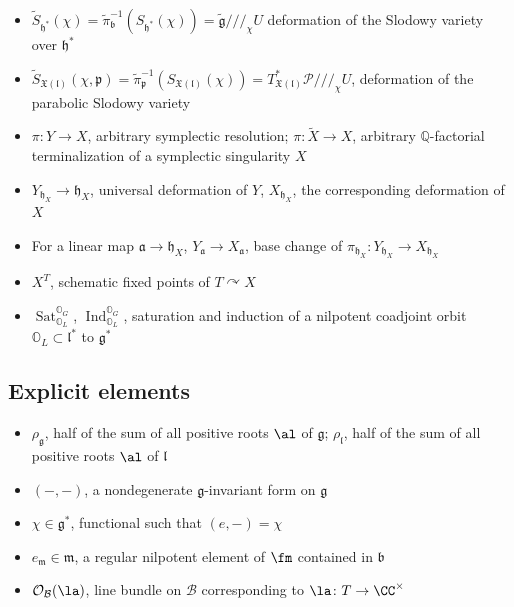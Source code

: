 \documentclass[12pt]{amsart}
\begin{document}
\begin{itemize}
    \item $\widetilde{S}_{\mathfrak{h}^*}(\chi)=\widetilde{\pi}^{-1}_{\mathfrak{b}}(S_{\mathfrak{h}^*}(\chi))=\widetilde{\mathfrak{g}}/\!/\!/_{\chi} U$  deformation of the Slodowy variety over $\mathfrak{h}^*$
    \item $\widetilde{S}_{\mathfrak{X}(\mathfrak{l})}(\chi,\mathfrak{p})=\widetilde{\pi}_{\mathfrak{p}}^{-1}(S_{\mathfrak{X}(\mathfrak{l})}(\chi))=T^*_{\mathfrak{X}(\mathfrak{l})}\mathcal{P}/\!/\!/_\chi U$, deformation of the parabolic Slodowy variety
    \item $\pi\colon Y \rightarrow X$, arbitrary symplectic resolution; $\pi\colon \widetilde{X} \rightarrow X$, arbitrary $\mathbb{Q}$-factorial terminalization of a symplectic singularity $X$
    \item $Y_{\mathfrak{h}_X} \rightarrow \mathfrak{h}_X$, universal deformation of $Y$, $X_{\mathfrak{h}_X}$, the corresponding deformation of $X$
    \item For a linear map $\mathfrak{a} \rightarrow \mathfrak{h}_X$, $Y_{\mathfrak{a}} \rightarrow X_{\mathfrak{a}}$, base change of $\pi_{\mathfrak{h}_X}\colon Y_{\mathfrak{h}_X} \rightarrow X_{\mathfrak{h}_X}$
        \item $X^T$, schematic fixed points of $T \curvearrowright X$
     \item $\operatorname{Sat}_{\mathbb{O}_L}^{\mathbb{O}_G}$, $\operatorname{Ind}_{\mathbb{O}_L}^{\mathbb{O}_G}$, saturation and induction of a nilpotent coadjoint orbit $\mathbb{O}_L \subset \mathfrak{l}^*$ to $\mathfrak{g}^*$    
\end{itemize}    


   
\subsection{Explicit elements}
\begin{itemize}
\item $\rho_{\mathfrak{g}}$, half of the sum of all positive roots $\al$ of $\mathfrak{g}$;  $\rho_{\mathfrak{l}}$, half of the sum of all positive roots $\al$ of $\mathfrak{l}$
\item $(-,-)$, a nondegenerate $\mathfrak{g}$-invariant form on $\mathfrak{g}$
\item $\chi \in \mathfrak{g}^*$, functional such that $(e,-)=\chi$
\item $e_{\mathfrak{m}} \in \mathfrak{m}$, a regular nilpotent element of $\fm$ contained in $\mathfrak{b}$
\item $\mathcal{O}_{\mathcal{B}}(\la)$, line bundle on $\mathcal{B}$ corresponding to $\la\colon T \rightarrow \CC^\times$
\end{itemize}
   
\end{document}
